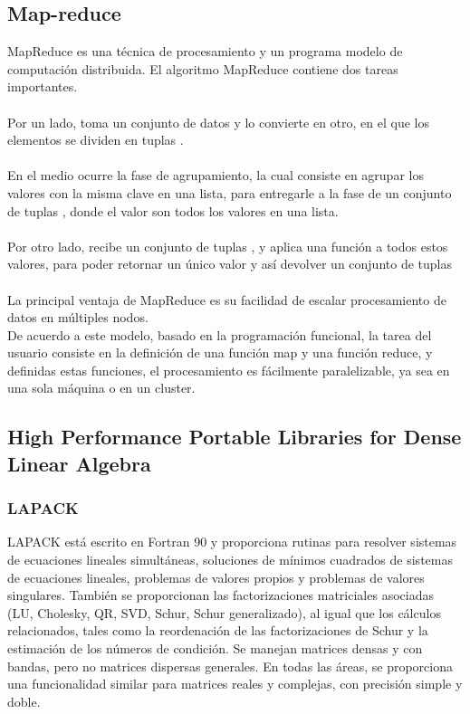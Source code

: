 \subsection{Map-reduce}
\hfill \break
MapReduce es una técnica de procesamiento y un programa modelo de computación
distribuida. El algoritmo MapReduce contiene dos tareas importantes.\\\\
Por un lado,  toma un conjunto de datos y lo convierte en otro, en el
que los elementos se dividen en tuplas .\\\\
En el medio ocurre la fase de agrupamiento, la cual consiste en agrupar los valores
con la misma clave en una lista, para entregarle a la fase de  un
conjunto de tuplas , donde el valor son todos los valores
en una lista.\\\\
Por otro lado,  recibe un conjunto de tuplas ,
y aplica una función a todos estos valores, para poder retornar un único valor y
así devolver un conjunto de tuplas \\\\
La principal ventaja de MapReduce es su facilidad de escalar procesamiento de
datos en múltiples nodos.\\
De acuerdo a este modelo, basado en la programación funcional, la tarea del
usuario consiste en la definición de una función map y una función reduce, y
definidas estas funciones, el procesamiento es fácilmente paralelizable, ya sea
en una sola máquina o en un cluster.\\

\subsection{High Performance Portable Libraries for Dense Linear Algebra}
    \def\text{overall picture}
    \def\path{overall.png}
    \def\scale{.6}
    
    \subsubsection{LAPACK}
        LAPACK está escrito en Fortran 90 y proporciona rutinas para resolver
        sistemas de ecuaciones lineales simultáneas, soluciones de mínimos
        cuadrados de sistemas de ecuaciones lineales, problemas de valores propios y
        problemas de valores singulares. También se proporcionan las factorizaciones
        matriciales asociadas (LU, Cholesky, QR, SVD, Schur, Schur generalizado),
        al igual que los cálculos relacionados, tales como la reordenación de las
        factorizaciones de Schur y la estimación de los números de condición. Se
        manejan matrices densas y con bandas, pero no matrices dispersas generales.
        En todas las áreas, se proporciona una funcionalidad similar para matrices
        reales y complejas, con precisión simple y doble.

